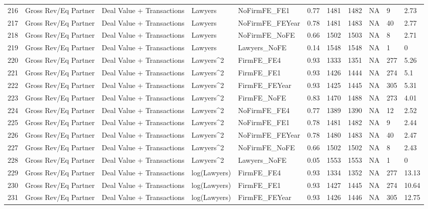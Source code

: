 \begin{table}[ht]
\begin{tabular}{rllllllllll}
  216 & Gross Rev/Eq Partner & Deal Value + Transactions & Lawyers & NoFirmFE\_FE1 & 0.77 & 1481 & 1482 & NA & 9 & 2.73 \\ 
  217 & Gross Rev/Eq Partner & Deal Value + Transactions & Lawyers & NoFirmFE\_FEYear & 0.78 & 1481 & 1483 & NA & 40 & 2.77 \\ 
  218 & Gross Rev/Eq Partner & Deal Value + Transactions & Lawyers & NoFirmFE\_NoFE & 0.66 & 1502 & 1503 & NA & 8 & 2.71 \\ 
  219 & Gross Rev/Eq Partner & Deal Value + Transactions & Lawyers & Lawyers\_NoFE & 0.14 & 1548 & 1548 & NA & 1 & 0 \\ 
  220 & Gross Rev/Eq Partner & Deal Value + Transactions & Lawyers^2 & FirmFE\_FE4 & 0.93 & 1333 & 1351 & NA & 277 & 5.26 \\ 
  221 & Gross Rev/Eq Partner & Deal Value + Transactions & Lawyers^2 & FirmFE\_FE1 & 0.93 & 1426 & 1444 & NA & 274 & 5.1 \\ 
  222 & Gross Rev/Eq Partner & Deal Value + Transactions & Lawyers^2 & FirmFE\_FEYear & 0.93 & 1425 & 1445 & NA & 305 & 5.31 \\ 
  223 & Gross Rev/Eq Partner & Deal Value + Transactions & Lawyers^2 & FirmFE\_NoFE & 0.83 & 1470 & 1488 & NA & 273 & 4.01 \\ 
  224 & Gross Rev/Eq Partner & Deal Value + Transactions & Lawyers^2 & NoFirmFE\_FE4 & 0.77 & 1389 & 1390 & NA & 12 & 2.52 \\ 
  225 & Gross Rev/Eq Partner & Deal Value + Transactions & Lawyers^2 & NoFirmFE\_FE1 & 0.78 & 1481 & 1482 & NA & 9 & 2.44 \\ 
  226 & Gross Rev/Eq Partner & Deal Value + Transactions & Lawyers^2 & NoFirmFE\_FEYear & 0.78 & 1480 & 1483 & NA & 40 & 2.47 \\ 
  227 & Gross Rev/Eq Partner & Deal Value + Transactions & Lawyers^2 & NoFirmFE\_NoFE & 0.66 & 1502 & 1502 & NA & 8 & 2.43 \\ 
  228 & Gross Rev/Eq Partner & Deal Value + Transactions & Lawyers^2 & Lawyers\_NoFE & 0.05 & 1553 & 1553 & NA & 1 & 0 \\ 
  229 & Gross Rev/Eq Partner & Deal Value + Transactions & log(Lawyers) & FirmFE\_FE4 & 0.93 & 1334 & 1352 & NA & 277 & 13.13 \\ 
  230 & Gross Rev/Eq Partner & Deal Value + Transactions & log(Lawyers) & FirmFE\_FE1 & 0.93 & 1427 & 1445 & NA & 274 & 10.64 \\ 
  231 & Gross Rev/Eq Partner & Deal Value + Transactions & log(Lawyers) & FirmFE\_FEYear & 0.93 & 1426 & 1446 & NA & 305 & 12.75 \\ 

\end{tabular}
\end{table}
